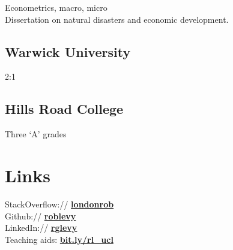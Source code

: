 \documentclass[a4paper,nomath]{deedy-resume} %
\begin{document}
\begin{paracol}{2}
    Econometrics, macro, micro\\
    Dissertation on natural disasters and economic development.
    \sectionspace %

    \subsection{Warwick University}
    2:1
    \sectionspace %


    \subsection{Hills Road College}
    Three `A' grades\\
    \sectionspace %


    \section{Links} 

    StackOverflow:// \href{http://stackoverflow.com/londonrob}{\bf londonrob} \\
    Github:// \href{https://github.com/roblevy}{\bf roblevy} \\
    LinkedIn:// \href{http://uk.linkedin.com/in/rglevy}{\bf rglevy} \\
    \sectionspace
    Teaching aids: \href{http://www.homepages.ucl.ac.uk/~ucfnlev/}{\bf bit.ly/rl\_ucl}

    \sectionspace %


\end{paracol}
\end{document}
